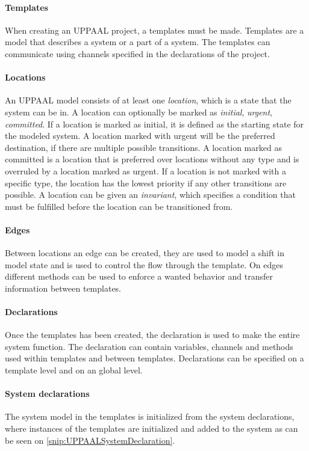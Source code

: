 \paragraph{Templates}
When creating an UPPAAL project, a templates must be made.
Templates are a model that describes a system or a part of a system.  
The templates can communicate using channels specified in the declarations of the project.

\paragraph{Locations}
An UPPAAL model consists of at least one \textit{location}, which is a state that the system can be in. 
A location can optionally be marked as \textit{initial}, \textit{urgent}, \textit{committed}. 
If a location is marked as initial, it is defined as the starting state for the modeled system. 
A location marked with urgent will be the preferred destination, if there are multiple possible transitions. 
A location marked as committed is a location that is preferred over locations without any type and is overruled by a location marked as urgent. 
If a location is not marked with a specific type, the location has the lowest priority if any other transitions are possible. 
A location can be given an \textit{invariant}, which specifies a condition that must be fulfilled before the location can be transitioned from.

\paragraph{Edges}
Between locations an edge can be created, they are used to model a shift in model state and is used to control the flow through the template. 
On edges different methods can be used to enforce a wanted behavior and transfer information between templates. 

\paragraph{Declarations}
Once the templates has been created, the declaration is used to make the entire system function. 
The declaration can contain variables, channels and methods used within templates and between templates. 
Declarations can be specified on a template level and on an global level. 

\paragraph{System declarations}
The system model in the templates is initialized from the system declarations, where instances of the templates are initialized and added to the system as can be seen on \autoref{snip:UPPAALSystemDeclaration}. 


